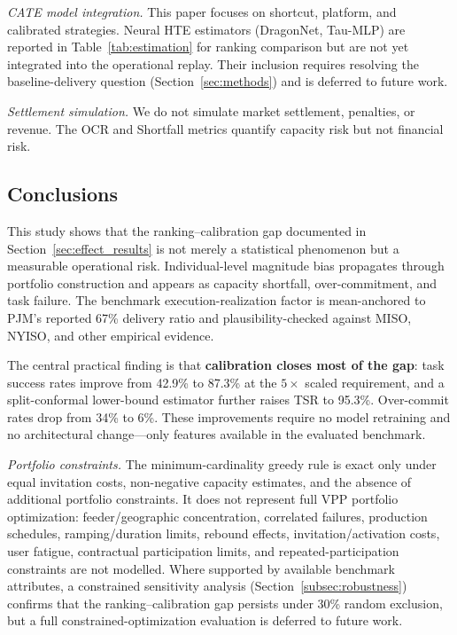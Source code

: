 \documentclass[utf8]{FrontiersinHarvard}
\begin{document}
\textit{CATE model integration.} This paper focuses on
shortcut, platform, and calibrated strategies. Neural HTE
estimators (DragonNet, Tau-MLP) are reported in
Table~\ref{tab:estimation} for ranking comparison but are not
yet integrated into the operational replay. Their inclusion
requires resolving the baseline-delivery question
(Section~\ref{sec:methods}) and is deferred to future work.

\textit{Settlement simulation.} We do not simulate market
settlement, penalties, or revenue. The OCR and Shortfall
metrics quantify capacity risk but not financial risk.

\subsection{Conclusions}

This study shows that the ranking--calibration gap documented
in Section~\ref{sec:effect_results} is not merely a statistical
phenomenon but a measurable operational risk. Individual-level
magnitude bias propagates through portfolio construction and
appears as capacity shortfall, over-commitment, and task
failure. The benchmark execution-realization factor is
mean-anchored to PJM's reported 67\% delivery ratio and
plausibility-checked against MISO, NYISO, and other empirical
evidence.

The central practical finding is that \textbf{calibration closes
most of the gap}: task success rates improve from 42.9\% to
87.3\% at the $5\times$ scaled requirement, and a
split-conformal lower-bound estimator further raises TSR to
95.3\%. Over-commit rates drop from 34\% to 6\%.
These improvements require no model retraining and no
architectural change---only features available in the evaluated
benchmark.

\textit{Portfolio constraints.} The minimum-cardinality greedy
rule is exact only under equal invitation costs, non-negative
capacity estimates, and the absence of additional portfolio
constraints. It does not represent full VPP portfolio
optimization: feeder/geographic concentration, correlated
failures, production schedules, ramping/duration limits,
rebound effects, invitation/activation costs, user fatigue,
contractual participation limits, and repeated-participation
constraints are not modelled. Where supported by available
benchmark attributes, a constrained sensitivity analysis
(Section~\ref{subsec:robustness}) confirms that the
ranking--calibration gap persists under 30\% random exclusion,
but a full constrained-optimization evaluation is deferred to
future work.
\end{document}
